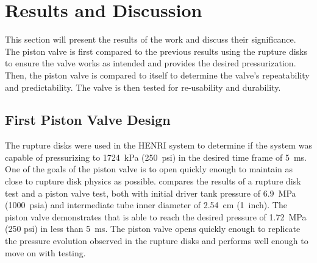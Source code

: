 \section{Results and Discussion} \label{s:results}
This section will present the results of the work and discuss their significance. The piston valve is first compared to the previous results using the rupture disks to ensure the valve works as intended and provides the desired pressurization. Then, the piston valve is compared to itself to determine the valve's repeatability and predictability. The valve is then tested for re-usability and durability.

\subsection{First Piston Valve Design}
The rupture disks were used in the HENRI system to determine if the system was capable of pressurizing to \SI{1724}{\kilo\pascal} (\SI{250}{psi}) in the desired time frame of \SI{5}{\milli\second}\cite{HeNURETH}. One of the goals of the piston valve is to open quickly enough to maintain as close to rupture disk physics as possible. 
 compares the results of a rupture disk test and a piston valve test, both with initial driver tank pressure of \SI{6.9}{\mega\pascal} (\SI{1000}{psia}) and intermediate tube inner diameter of \SI{2.54}{\centi\meter} (\SI{1}{inch}). The piston valve demonstrates that is able to reach the desired pressure of \SI{1.72}{\mega\pascal} (250 psi) in less than \SI{5}{\milli\second}. The piston valve opens quickly enough to replicate the pressure evolution observed in the rupture disks and performs well enough to move on with testing.

